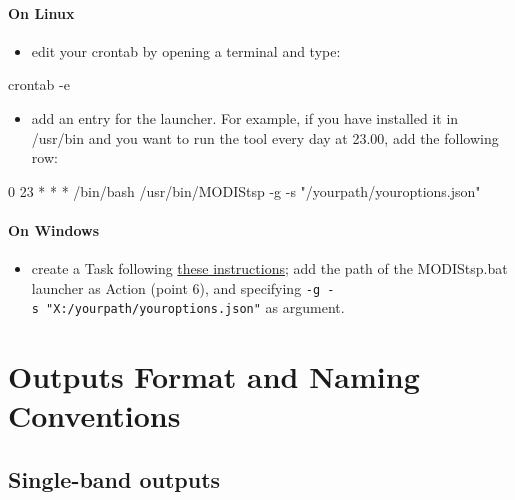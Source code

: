 \documentclass[]{article}
\newenvironment{Shaded}{\begin{snugshade}}{\end{snugshade}}
\newcommand{\StringTok}[1]{\textcolor[rgb]{0.31,0.60,0.02}{#1}}
\newcommand{\ExtensionTok}[1]{#1}
\newcommand{\NormalTok}[1]{#1}
\providecommand{\tightlist}{%
  \setlength{\itemsep}{0pt}\setlength{\parskip}{0pt}}
\let\oldparagraph\paragraph
\renewcommand{\paragraph}[1]{\oldparagraph{#1}\mbox{}}
\begin{document}
\paragraph{On Linux}\label{on-linux}

\begin{itemize}
\tightlist
\item
  edit your crontab by opening a terminal and type:
\end{itemize}

\begin{Shaded}
\begin{Highlighting}[]
  \ExtensionTok{crontab}\NormalTok{ -e}
\end{Highlighting}
\end{Shaded}

\begin{itemize}
\tightlist
\item
  add an entry for the launcher. For example, if you have installed it
  in /usr/bin and you want to run the tool every day at 23.00, add the
  following row:
\end{itemize}

\begin{Shaded}
\begin{Highlighting}[]
  \ExtensionTok{0}\NormalTok{ 23 * * * /bin/bash /usr/bin/MODIStsp -g -s }\StringTok{"/yourpath/youroptions.json"}
\end{Highlighting}
\end{Shaded}

\paragraph{On Windows}\label{on-windows-1}

\begin{itemize}
\tightlist
\item
  create a Task following
  \href{https://technet.microsoft.com/en-us/library/cc748993.aspx}{these
  instructions}; add the path of the MODIStsp.bat launcher as Action
  (point 6), and specifying
  \texttt{-g\ -s\ "X:/yourpath/youroptions.json"} as argument.
\end{itemize}

\section{Outputs Format and Naming
Conventions}\label{outputs-format-and-naming-conventions}

\subsection{Single-band outputs}\label{single-band-outputs}
\end{document}

